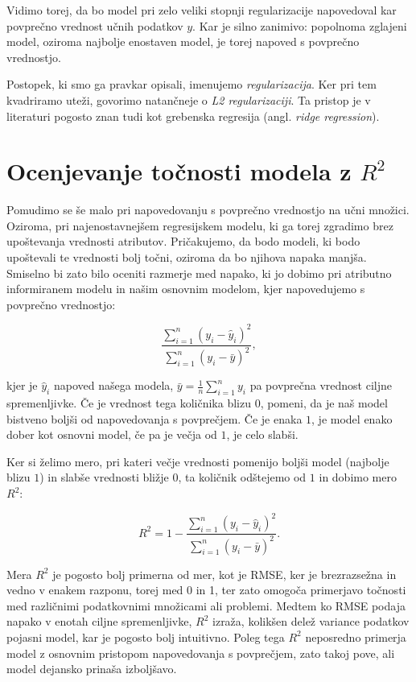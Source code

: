 Vidimo torej, da bo model pri zelo veliki stopnji regularizacije napovedoval kar povprečno vrednost učnih podatkov $y$. Kar je silno zanimivo: popolnoma zglajeni model, oziroma najbolje enostaven model, je torej napoved s povprečno vrednostjo.

Postopek, ki smo ga pravkar opisali, imenujemo \emph{regularizacija}. Ker pri tem kvadriramo uteži, govorimo natančneje o \emph{L2 regularizaciji}. Ta pristop je v literaturi pogosto znan tudi kot grebenska regresija (angl. \emph{ridge regression}).

\section{Ocenjevanje točnosti modela z $R^2$}

Pomudimo se še malo pri napovedovanju s povprečno vrednostjo na učni množici. Oziroma, pri najenostavnejšem regresijskem modelu, ki ga torej zgradimo brez upoštevanja vrednosti atributov. Pričakujemo, da bodo modeli, ki bodo upoštevali te vrednosti bolj točni, oziroma da bo njihova napaka manjša. Smiselno bi zato bilo oceniti razmerje med napako, ki jo dobimo pri atributno informiranem modelu in našim osnovnim modelom, kjer napovedujemo s povprečno vrednostjo:

\[
\frac{\sum_{i=1}^{n}(y_i - \hat{y}_i)^2}
{\sum_{i=1}^{n}(y_i - \bar{y})^2},
\]

kjer je $\hat{y}_i$ napoved našega modela, $\bar{y} = \frac{1}{n}\sum_{i=1}^{n} y_i$ pa povprečna vrednost ciljne spremenljivke. Če je vrednost tega količnika blizu $0$, pomeni, da je naš model bistveno boljši od napovedovanja s povprečjem. Če je enaka $1$, je model enako dober kot osnovni model, če pa je večja od $1$, je celo slabši.

Ker si želimo mero, pri kateri večje vrednosti pomenijo boljši model (najbolje blizu $1$) in slabše vrednosti bližje $0$, ta količnik odštejemo od $1$ in dobimo mero $R^2$:

\[
R^2 = 1 - \frac{\sum_{i=1}^{n}(y_i - \hat{y}_i)^2}
{\sum_{i=1}^{n}(y_i - \bar{y})^2}.
\]

Mera $R^2$ je pogosto bolj primerna od mer, kot je RMSE, ker je brezrazsežna in vedno v enakem razponu, torej med 0 in 1,
%
%
ter zato omogoča primerjavo točnosti med različnimi podatkovnimi množicami ali problemi. Medtem ko RMSE podaja napako v enotah ciljne spremenljivke, $R^2$ izraža, kolikšen delež variance podatkov pojasni model, kar je pogosto bolj intuitivno. Poleg tega $R^2$ neposredno primerja model z osnovnim pristopom napovedovanja s povprečjem, zato takoj pove, ali model dejansko prinaša izboljšavo.

